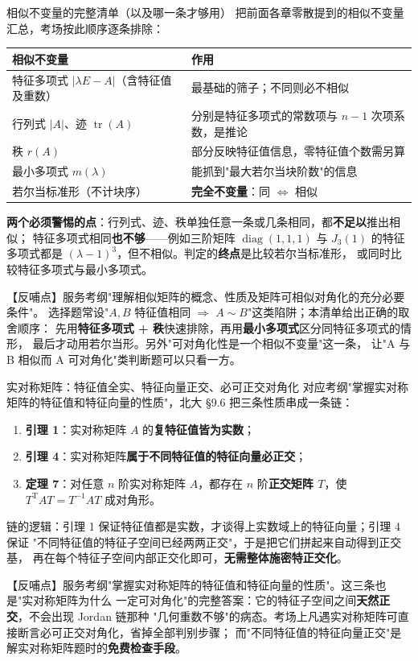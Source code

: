 \begin{fdeep}{相似不变量的完整清单（以及哪一条才够用）}
把前面各章零散提到的相似不变量汇总，考场按此顺序逐条排除：
\begin{center}
\begin{tabular}{@{}ll@{}}
\textbf{相似不变量} & \textbf{作用} \\
\hline
特征多项式 $|\lambda E-A|$（含特征值及重数） & 最基础的筛子；不同则必不相似 \\
行列式 $|A|$、迹 $\operatorname{tr}(A)$ & 分别是特征多项式的常数项与 $n-1$ 次项系数，是推论 \\
秩 $r(A)$ & 部分反映特征值信息，零特征值个数需另算 \\
最小多项式 $m(\lambda)$ & 能抓到"最大若尔当块阶数"的信息 \\
若尔当标准形（不计块序） & \textbf{完全不变量}：同 $\iff$ 相似 \\
\end{tabular}
\end{center}
\textbf{两个必须警惕的点}：行列式、迹、秩单独任意一条或几条相同，都\textbf{不足以}推出相似；
特征多项式相同\textbf{也不够}——例如三阶矩阵 $\operatorname{diag}(1,1,1)$ 与 $J_3(1)$ 的特征
多项式都是 $(\lambda-1)^3$，但不相似。判定的\textbf{终点}是比较若尔当标准形，
或同时比较特征多项式与最小多项式。

【反哺点】服务考纲"理解相似矩阵的概念、性质及矩阵可相似对角化的充分必要条件"。
选择题常设"$A,B$ 特征值相同 $\Rightarrow$ $A\sim B$"这类陷阱；本清单给出正确的取舍顺序：
先用\textbf{特征多项式 + 秩}快速排除，再用\textbf{最小多项式}区分同特征多项式的情形，
最后才动用若尔当形。另外"可对角化性是一个相似不变量"这一条，
让"A 与 B 相似而 A 可对角化"类判断题可以只看一方。
\end{fdeep}


\begin{fdeep}{实对称矩阵：特征值全实、特征向量正交、必可正交对角化}
对应考纲"掌握实对称矩阵的特征值和特征向量的性质"，北大 §9.6 把三条性质串成一条链：
\begin{enumerate}[leftmargin=2.2em,itemsep=0.2em]
\item \textbf{引理 1}：实对称矩阵 $A$ 的\textbf{复特征值皆为实数}；
\item \textbf{引理 4}：实对称矩阵\textbf{属于不同特征值的特征向量必正交}；
\item \textbf{定理 7}：对任意 $n$ 阶实对称矩阵 $A$，都存在 $n$ 阶\textbf{正交矩阵 $T$}，使
      $T^{\mathrm{T}}AT=T^{-1}AT$ 成对角形。
\end{enumerate}
链的逻辑：引理 1 保证特征值都是实数，才谈得上实数域上的特征向量；引理 4 保证
"不同特征值的特征子空间已经两两正交"，于是把它们拼起来自动得到正交基，
再在每个特征子空间内部正交化即可，\textbf{无需整体施密特正交化}。

【反哺点】服务考纲"掌握实对称矩阵的特征值和特征向量的性质"。这三条也是"实对称矩阵为什么
一定可对角化"的完整答案：它的特征子空间之间\textbf{天然正交}，不会出现 Jordan 链那种
"几何重数不够"的病态。考场上凡遇实对称矩阵可直接断言必可正交对角化，省掉全部判别步骤；
而"不同特征值的特征向量正交"是解实对称矩阵题时的\textbf{免费检查手段}。
\end{fdeep}

